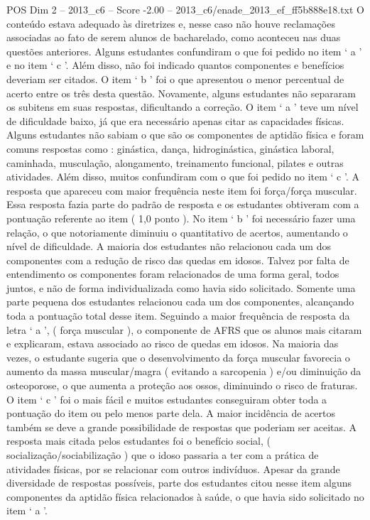 \begin{textsample}{POS Dim 2 – 2013\_c6 – Score -2.00 – 2013\_c6/enade\_2013\_ef\_ff5b888e18.txt}
O conteúdo estava adequado às diretrizes e, nesse caso não houve reclamações associadas ao fato de serem alunos de bacharelado, como aconteceu nas duas questões anteriores.
Alguns estudantes confundiram o que foi pedido no item ‘ a ’ e no item ‘ c ’.
Além disso, não foi indicado quantos componentes e benefícios deveriam ser citados.
O item ‘ b ’ foi o que apresentou o menor percentual de acerto entre os três desta questão.
Novamente, alguns estudantes não separaram os subitens em suas respostas, dificultando a correção.
O item ‘ a ’ teve um nível de dificuldade baixo, já que era necessário apenas citar as capacidades físicas.
Alguns estudantes não sabiam o que são os componentes de aptidão física e foram comuns respostas como : ginástica, dança, hidroginástica, ginástica laboral, caminhada, musculação, alongamento, treinamento funcional, pilates e outras atividades.
Além disso, muitos confundiram com o que foi pedido no item ‘ c ’.
A resposta que apareceu com maior frequência neste item foi força/força muscular.
Essa resposta fazia parte do padrão de resposta e os estudantes obtiveram com a pontuação referente ao item ( 1,0 ponto ).
No item ‘ b ’ foi necessário fazer uma relação, o que notoriamente diminuiu o quantitativo de acertos, aumentando o nível de dificuldade.
A maioria dos estudantes não relacionou cada um dos componentes com a redução de risco das quedas em idosos.
Talvez por falta de entendimento os componentes foram relacionados de uma forma geral, todos juntos, e não de forma individualizada como havia sido solicitado.
Somente uma parte pequena dos estudantes relacionou cada um dos componentes, alcançando toda a pontuação total desse item.
Seguindo a maior frequência de resposta da letra ‘ a ’, ( força muscular ), o componente de AFRS que os alunos mais citaram e explicaram, estava associado ao risco de quedas em idosos.
Na maioria das vezes, o estudante sugeria que o desenvolvimento da força muscular favorecia o aumento da massa muscular/magra ( evitando a sarcopenia ) e/ou diminuição da osteoporose, o que aumenta a proteção aos ossos, diminuindo o risco de fraturas.
O item ‘ c ’ foi o mais fácil e muitos estudantes conseguiram obter toda a pontuação do item ou pelo menos parte dela.
A maior incidência de acertos também se deve a grande possibilidade de respostas que poderiam ser aceitas.
A resposta mais citada pelos estudantes foi o benefício social, ( socialização/sociabilização ) que o idoso passaria a ter com a prática de atividades físicas, por se relacionar com outros indivíduos.
Apesar da grande diversidade de respostas possíveis, parte dos estudantes citou nesse item alguns componentes da aptidão física relacionados à saúde, o que havia sido solicitado no item ‘ a ’.

\end{textsample}
